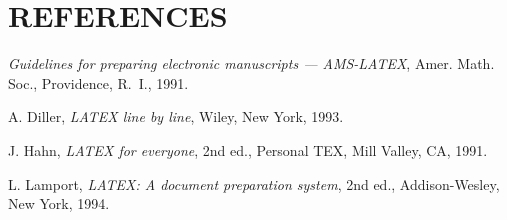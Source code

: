 %    


\thispagestyle{plain}


\chapter*{REFERENCES}


\begin{thebibliography}{99}
\itemsep 0pt\relax

   {\em Guidelines for preparing electronic manuscripts --- AMS-LATEX},
   Amer. Math. Soc., Providence, R.~I., 1991.


   A. Diller,
   {\em LATEX line by line}, 
   Wiley, New York, 1993.

   J. Hahn, 
   {\em LATEX for everyone}, 2nd ed., 
   Personal TEX, Mill Valley, CA, 1991.
 
   L. Lamport,
   {\em LATEX:  A document preparation system}, 2nd ed.,
   Addison-Wesley, New York, 1994.


\end{thebibliography}

\clearpage
\endinput
